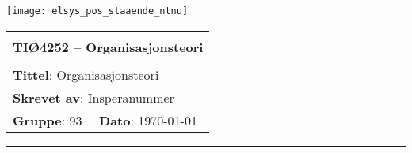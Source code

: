 \documentclass[a4paper,11pt,norsk]{article}
\begin{document}
\setcounter{page}{0}

\begin{minipage}[c]{0.15\textwidth}
    \texttt{[image: elsys\_pos\_staaende\_ntnu]}  
\end{minipage}
\begin{minipage}[c]{0.85\textwidth}


\renewcommand{\arraystretch}{1.7}
\large 
\begin{tabularx}{\textwidth}{|X|X|}
\hline
\multicolumn{2}{|l|}{} \\
\multicolumn{2}{|l|}{\huge \textbf{TIØ4252 -- Organisasjonsteori}} \\
\multicolumn{2}{|l|}{}  \\
\hline
\multicolumn{2}{|l|}{\textbf{Tittel}:  
Organisasjonsteori
} \\
\hline
\multicolumn{2}{|l|}{\textbf{Skrevet av}:
Insperanummer
} \\
\hline
\textbf{Gruppe}: 93  & \textbf{Dato}: \today
\\
\hline 
\end{tabularx}
\end{minipage}
\normalsize

\newpage


\pagestyle{fancy}
\fancyhf{}
\renewcommand{\footrulewidth}{0.5pt}

\clearpage

\setlength{\parskip}{1ex}
\renewcommand{\baselinestretch}{0.1}\normalsize
\tableofcontents
\renewcommand{\baselinestretch}{1.00}\normalsize
\setlength{\parskip}{2ex}
\rule{\textwidth}{0.5pt}


\newpage






{}

\begingroup
\makeatletter
\makeatother
{}


\endgroup

\nocite{*} %
\clearpage
\appendix

\end{document}
